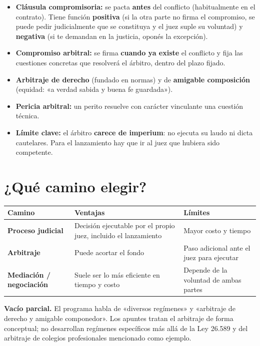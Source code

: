 \begin{itemize}
  \item \textbf{Cláusula compromisoria:} se pacta \textbf{antes} del conflicto (habitualmente en el contrato). Tiene función \textbf{positiva} (si la otra parte no firma el compromiso, se puede pedir judicialmente que se constituya y el juez suple su voluntad) y \textbf{negativa} (si te demandan en la justicia, oponés la excepción).
  \item \textbf{Compromiso arbitral:} se firma \textbf{cuando ya existe} el conflicto y fija las cuestiones concretas que resolverá el árbitro, dentro del plazo fijado.
  \item \textbf{Arbitraje de derecho} (fundado en normas) y de \textbf{amigable composición} (equidad: «a verdad sabida y buena fe guardada»).
  \item \textbf{Pericia arbitral:} un perito resuelve con carácter vinculante una cuestión técnica.
  \item \textbf{Límite clave:} el árbitro \textbf{carece de imperium}: no ejecuta su laudo ni dicta cautelares. Para el lanzamiento hay que ir al juez que hubiera sido competente.
\end{itemize}

\section{¿Qué camino elegir?}

\begin{center}
\begin{tabularx}{\textwidth}{>{\raggedright\arraybackslash}p{3.4cm} Y Y}
\toprule
\textbf{Camino} & \textbf{Ventajas} & \textbf{Límites} \\
\midrule
\textbf{Proceso judicial} & Decisión ejecutable por el propio juez, incluido el lanzamiento & Mayor costo y tiempo \\
\addlinespace
\textbf{Arbitraje} & Puede acortar el fondo & Paso adicional ante el juez para ejecutar \\
\addlinespace
\textbf{Mediación / negociación} & Suele ser lo más eficiente en tiempo y costo & Depende de la voluntad de ambas partes \\
\bottomrule
\end{tabularx}
\end{center}

\begin{note}
\textbf{Vacío parcial.} El programa habla de «diversos regímenes» y «arbitraje de derecho y amigable componedor». Los apuntes tratan el arbitraje de forma conceptual; no desarrollan regímenes específicos más allá de la Ley 26.589 y del arbitraje de colegios profesionales mencionado como ejemplo.
\end{note}

